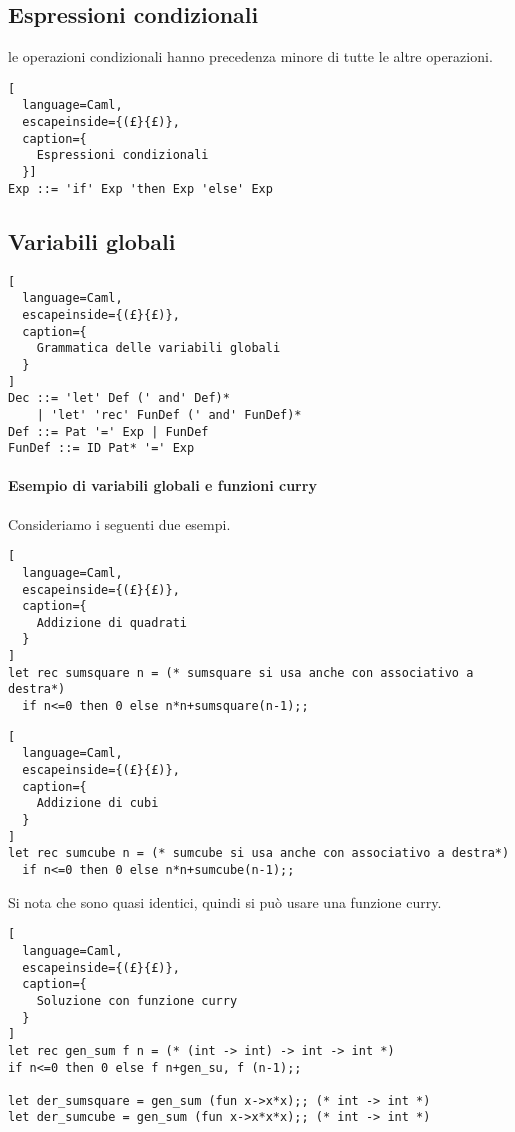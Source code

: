 \subsection{Espressioni condizionali}
le operazioni condizionali hanno precedenza minore di tutte le altre
operazioni.

\begin{lstlisting}[
  language=Caml,
  escapeinside={(£}{£)},
  caption={
    Espressioni condizionali
  }]
Exp ::= 'if' Exp 'then Exp 'else' Exp
\end{lstlisting}

\subsection{Variabili globali}
\begin{lstlisting}[
  language=Caml,
  escapeinside={(£}{£)},
  caption={
    Grammatica delle variabili globali
  }
]
Dec ::= 'let' Def (' and' Def)*
    | 'let' 'rec' FunDef (' and' FunDef)*
Def ::= Pat '=' Exp | FunDef
FunDef ::= ID Pat* '=' Exp
\end{lstlisting}

\paragraph{Esempio di variabili globali e funzioni curry}
Consideriamo i seguenti due esempi.
\begin{lstlisting}[
  language=Caml,
  escapeinside={(£}{£)},
  caption={
    Addizione di quadrati
  }
]
let rec sumsquare n = (* sumsquare si usa anche con associativo a destra*)
  if n<=0 then 0 else n*n+sumsquare(n-1);;
\end{lstlisting}

\begin{lstlisting}[
  language=Caml,
  escapeinside={(£}{£)},
  caption={
    Addizione di cubi
  }
]
let rec sumcube n = (* sumcube si usa anche con associativo a destra*)
  if n<=0 then 0 else n*n+sumcube(n-1);;
\end{lstlisting}


Si nota che sono quasi identici, quindi si può usare una funzione curry.

\begin{lstlisting}[
  language=Caml,
  escapeinside={(£}{£)},
  caption={
    Soluzione con funzione curry
  }
]
let rec gen_sum f n = (* (int -> int) -> int -> int *)
if n<=0 then 0 else f n+gen_su, f (n-1);;

let der_sumsquare = gen_sum (fun x->x*x);; (* int -> int *)
let der_sumcube = gen_sum (fun x->x*x*x);; (* int -> int *)
\end{lstlisting}

